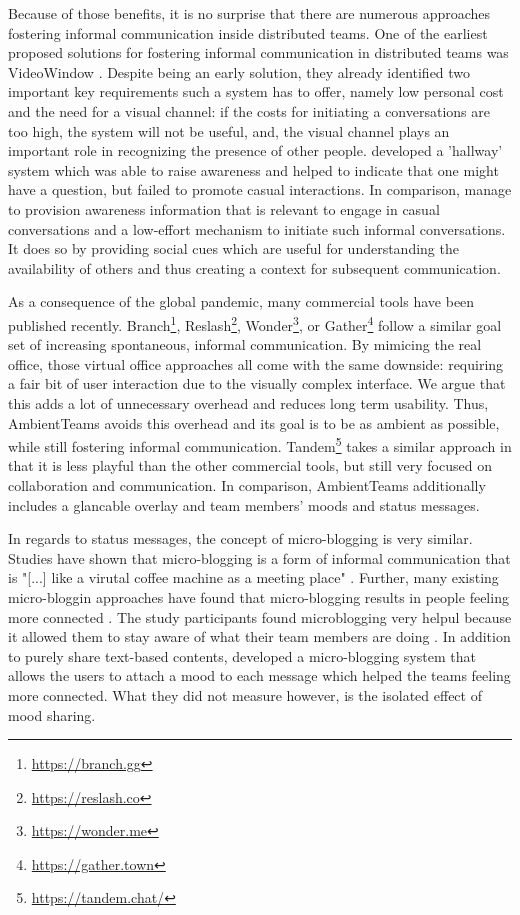 Because of those benefits, it is no surprise that there are numerous approaches fostering informal communication inside distributed teams. One of the earliest proposed solutions for fostering informal communication in distributed teams was VideoWindow \autocite{fish1990videowindow}. Despite being an early solution, they already identified two important key requirements such a system has to offer, namely low personal cost and the need for a visual channel: if the costs for initiating a conversations are too high, the system will not be useful, and, the visual channel plays an important role in recognizing the presence of other people. \textcite{sasaki1999video} developed a 'hallway' system which was able to raise awareness and helped to indicate that one might have a question, but failed to promote casual interactions. In comparison, \textcite{lou2012presencescape} manage to provision awareness information that is relevant to engage in casual conversations and a low-effort mechanism to initiate such informal conversations. It does so by providing social cues which are useful for understanding the availability of others and thus creating a context for subsequent communication.

As a consequence of the global pandemic, many commercial tools have been published recently. Branch\footnote{\url{https://branch.gg}}, Reslash\footnote{\url{https://reslash.co}}, Wonder\footnote{\url{https://wonder.me}}, or Gather\footnote{\url{https://gather.town}} follow a similar goal set of increasing spontaneous, informal communication. By mimicing the real office, those virtual office approaches all come with the same downside: requiring a fair bit of user interaction due to the visually complex interface. We argue that this adds a lot of unnecessary overhead and reduces long term usability. Thus, AmbientTeams avoids this overhead and its goal is to be as ambient as possible, while still fostering informal communication. Tandem\footnote{\url{https://tandem.chat/}} takes a similar approach in that it is less playful than the other commercial tools, but still very focused on collaboration and communication. In comparison, AmbientTeams additionally includes a glancable overlay and team members' moods and status messages.

In regards to status messages, the concept of micro-blogging is very similar. Studies have shown that micro-blogging is a form of informal communication \autocite{ehrlich2010microblogging} that is "[...] like a virutal coffee machine as a meeting place" \autocite{ebner2008microblogging}. Further, many existing micro-bloggin approaches have found that micro-blogging results in people feeling more connected \autocite{ehrlich2010microblogging, zhang2010case}. The study participants found microblogging very helpul because it allowed them to stay aware of what their team members are doing \autocite{zhang2010case}. In addition to purely share text-based contents, \textcite{dullemond2013fixing} developed a micro-blogging system that allows the users to attach a mood to each message which helped the teams feeling more connected. What they did not measure however, is the isolated effect of mood sharing.

